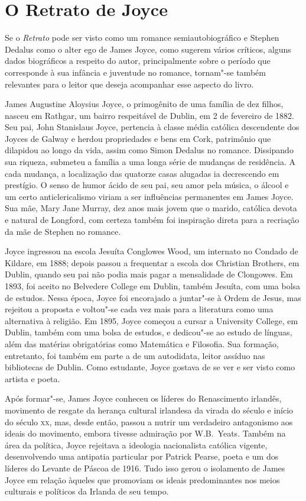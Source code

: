 \section{O Retrato de Joyce}

Se o \textit{Retrato} pode ser visto como um romance semiautobiográfico
e Stephen Dedalus como o alter ego de James Joyce, como sugerem vários
críticos, alguns dados biográficos a respeito do autor, principalmente
sobre o período que corresponde à sua infância e juventude no romance,
tornam"-se também relevantes para o leitor que deseja acompanhar esse
aspecto do livro.  

James Augustine Aloysius Joyce, o primogênito de uma família de dez
filhos, nasceu em Rathgar, um bairro respeitável de Dublin, em 2 de
fevereiro de 1882. Seu pai, John Stanislaus Joyce, pertencia à classe
média católica descendente dos Joyces de Galway e herdou propriedades e
bens em Cork, patrimônio que dilapidou ao longo da vida, assim como
Simon Dedalus no romance. Dissipando sua riqueza, submeteu a família a
uma longa série de mudanças de residência. A cada mudança, a
localização das quatorze casas alugadas ia decrescendo em prestígio. O
senso de humor ácido de seu pai, seu amor pela música, o álcool e um
certo anticlericalismo viriam a ser influências permanentes em James
Joyce. Sua mãe, Mary Jane Murray, dez anos mais jovem que o marido,
católica devota e natural de Longford, com certeza também foi
inspiração direta para a recriação da mãe de Stephen no romance.

Joyce ingressou na escola Jesuíta Conglowes Wood, um internato no
Condado de Kildare, em 1888; depois passou a frequentar a escola dos
Christian Brothers, em Dublin, quando seu pai não podia mais pagar a
mensalidade de Clongowes. Em 1893, foi aceito no Belvedere College em
Dublin, também Jesuíta, com uma bolsa de estudos. Nessa época, Joyce
foi encorajado a juntar"-se à Ordem de Jesus, mas rejeitou a proposta e
voltou"-se cada vez mais para a literatura como uma alternativa à
religião. Em 1895, Joyce começou a cursar a University College, em
Dublin, também com uma bolsa de estudos, e dedicou"-se ao estudo de
línguas, além das matérias obrigatórias como Matemática e Filosofia.
Sua formação, entretanto, foi também em parte a de um autodidata,
leitor assíduo nas bibliotecas de Dublin. Como estudante, Joyce gostava
de se ver e ser visto como artista e poeta. 

Após formar"-se, James Joyce conheceu os líderes do Renascimento
irlandês, movimento de resgate da herança cultural irlandesa da virada
do século e início do século \textsc{xx}, mas, desde então, passou a nutrir um
verdadeiro antagonismo aos ideais do movimento, embora tivesse
admiração por W.B.~Yeats. Também na área da política, Joyce rejeitava
a ideologia nacionalista católica vigente, desenvolvendo uma antipatia
particular por Patrick Pearse, poeta e um dos líderes do Levante de
Páscoa de 1916.  Tudo isso gerou o isolamento de James Joyce em relação
àqueles que promoviam os ideais predominantes nos meios culturais e
políticos da Irlanda de seu tempo.  


